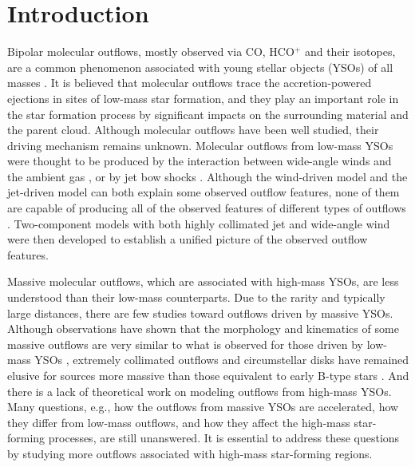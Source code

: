 \section{Introduction}
Bipolar molecular outflows, mostly observed via CO, HCO$^+$ and their isotopes, are a common phenomenon associated with young stellar objects (YSOs) of all masses \citep{2001ApJ...552L.167Z, 2002A&A...383..892B, 2004A&A...426..503W, 2005AJ....129..330W,  2015MNRAS.453..645M}. It is believed that molecular outflows trace the accretion-powered ejections in sites of low-mass star formation, and they play an important role in the star formation process by significant impacts on the surrounding material and the parent cloud. Although molecular outflows have been well studied, their driving mechanism remains unknown. Molecular outflows from low-mass YSOs were thought to be produced by the interaction between wide-angle winds and the ambient gas \citep{1991ApJ...370L..31S, 2001ApJ...557..429L}, or by jet bow shocks \citep{1993A&A...278..267R, 1993ApJ...414..230M, 2001ApJ...557..429L}. Although the wind-driven model and the jet-driven model can both explain some observed outflow features, none of them are capable of producing all of the observed features of different types of outflows \citep{2000ApJ...542..925L, 2002ApJ...576..294L}. Two-component models with both highly collimated jet and wide-angle wind were then developed to establish a unified picture of the observed outflow features\citep{2000prpl.conf..789S, 2006ApJ...641..949B, 2006MNRAS.365.1131P, 2006ApJ...649..845S, 2007prpl.conf..277P, 2008ApJ...676.1088M}.

Massive molecular outflows, which are associated with high-mass YSOs, are less understood than their low-mass counterparts. Due to the rarity and typically large distances, there are few studies toward outflows driven by massive YSOs. Although observations have shown that the morphology and kinematics of some massive outflows are very similar to what is observed for those driven by low-mass YSOs \citep[][]{1998ApJ...507..861S, 2002A&A...387..931B, 2009ApJ...696...66Q, 2011MNRAS.415L..49R}, extremely collimated outflows and circumstellar disks have remained elusive for sources more massive than those equivalent to early B-type stars \citep{2007prpl.conf..245A}. And there is a lack of theoretical work on modeling outflows from high-mass YSOs. Many questions, e.g., how the outflows from massive YSOs are accelerated, how they differ from low-mass outflows, and how they affect the high-mass star-forming processes, are still unanswered. It is essential to address these questions by studying more outflows associated with high-mass star-forming regions. 

